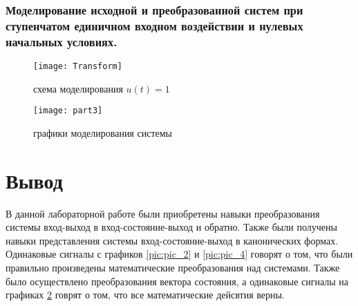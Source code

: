 \subsubsection{Моделирование исходной и преобразованной систем при ступенчатом единичном входном воздействии и нулевых начальных условиях.}

\begin{figure}[H]
	\begin{center}
		\texttt{[image: Transform]}
		\caption{схема моделирования $u(t) = 1$} 
		\label{pic:pic_5} %
	\end{center}
\end{figure}

\begin{figure}[H]
	\begin{center}
		\texttt{[image: part3]}
		\caption{графики моделирования системы} 
		\label{pic:pic_6} %
	\end{center}
\end{figure}

\newpage

\section{Вывод}
В данной лабораторной работе были приобретены навыки преобразования системы вход-выход в вход-состояние-выход и обратно. Также были получены навыки представления системы вход-состояние-выход в канонических формах. Одинаковые сигналы с графиков \ref{pic:pic_2} и \ref{pic:pic_4} говорят о том, что были правильно произведены математические преобразования над системами. Также было осуществлено преобразования вектора состояния, а одинаковые сигналы на графиках \ref{pic:pic_6} говрят о том, что все математические дейсвтия верны.

